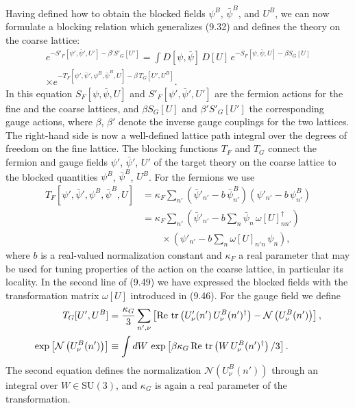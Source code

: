 Having defined how to obtain the blocked fields $\psi^B$, $\bar\psi^B$, and
$U^B$, we can now formulate a blocking relation which generalizes (9.32) and
defines the theory on the coarse lattice:
\begin{multline}
  e^{-S'_F[\psi',\bar\psi',U'] - \beta' S'_G[U']}
  = \int D[\psi,\bar\psi]\,D[U]\,e^{-S_F[\psi,\bar\psi,U] - \beta S_G[U]} \\
  \times e^{-T_F[\psi',\bar\psi',\psi^B,\bar\psi^B,U] - \beta\,T_G[U',U^B]} .
\end{multline}
In this equation $S_F[\psi,\bar\psi,U]$ and $S'_F[\psi',\bar\psi',U']$ are the
fermion actions for the fine and the coarse lattices, and $\beta S_G[U]$ and
$\beta' S'_G[U']$ the corresponding gauge actions, where $\beta$, $\beta'$
denote the inverse gauge couplings for the two lattices. The right-hand side
is now a well-defined lattice path integral over the degrees of freedom on the
fine lattice. The blocking functions $T_F$ and $T_G$ connect the fermion and
gauge fields $\psi'$, $\bar\psi'$, $U'$ of the target theory on the coarse
lattice to the blocked quantities $\psi^B$, $\bar\psi^B$, $U^B$. For the
fermions we use
\begin{align}
  T_F[\psi',\bar\psi',\psi^B,\bar\psi^B,U]
  &= \kappa_F\sum_{n'}\left(\bar\psi'_{n'} - b\,\bar\psi^B_{n'}\right)
     \left(\psi'_{n'} - b\,\psi^B_{n'}\right) \nonumber\\
  &= \kappa_F\sum_{n'}\left(\bar\psi'_{n'} - b\sum_n\bar\psi_n\,\omega[U]^\dagger_{nn'}\right) \nonumber\\
  &\qquad \times\left(\psi'_{n'} - b\sum_n\omega[U]_{n'n}\,\psi_n\right) ,
\end{align}
where $b$ is a real-valued normalization constant and $\kappa_F$ a real
parameter that may be used for tuning properties of the action on the coarse
lattice, in particular its locality. In the second line of (9.49) we have
expressed the blocked fields with the transformation matrix $\omega[U]$
introduced in (9.46). For the gauge field we define
\begin{align}
  T_G[U',U^B] &= \frac{\kappa_G}{3}\sum_{n',\nu}
    \left[\mathrm{Re}\,\operatorname{tr}\left(U'_\nu(n')\,U^B_\nu(n')^\dagger\right)
      - \mathcal{N}\left(U^B_\nu(n')\right)\right] , \nonumber\\
  \exp\left[\mathcal{N}\left(U^B_\nu(n')\right)\right]
  &\equiv \int dW\,\exp\left[\beta\kappa_G\,\mathrm{Re}\,\operatorname{tr}\left(W\,U^B_\nu(n')^\dagger\right)/3\right] .
\end{align}
The second equation defines the normalization $\mathcal{N}(U^B_\nu(n'))$
through an integral over $W \in \mathrm{SU}(3)$, and $\kappa_G$ is again a
real parameter of the transformation.

